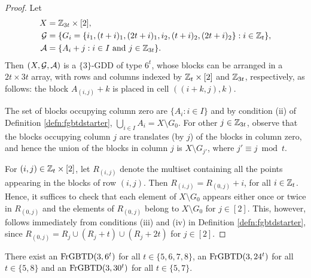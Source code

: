 \documentclass[draft, 11pt]{article}
\begin{document}
\begin{proof}
Let
\begin{align*}
X &= \mathbb Z_{3t}\times[2], \\
\mathcal G &= \{ G_i=\{i_1,(t+i)_1,(2t+i)_1, i_2,(t+i)_2,(2t+i)_2\} : i\in\mathbb Z_t \},  \\
\mathcal A &= \{A_i+j:\text{$i\in I$ and $j\in\mathbb Z_{3t}$}\}.
\end{align*}
Then $(X,\mathcal G,\mathcal A)$ is a $\{3\}$-GDD of type $6^t$, whose blocks can be arranged in a
$2t\times 3t$ array, with rows and columns indexed by $\mathbb Z_t\times[2]$
and $\mathbb Z_{3t}$, respectively, as follows: the block $A_{(i,j)}+k$ is placed in
cell $((i+k,j),k)$.

The set of blocks occupying column zero are $\{A_i:i\in I\}$ and
by condition (ii) of Definition \ref{defn:fgbtdstarter}, $\bigcup_{i\in I} A_i=X\setminus G_0$.
For other $j\in\mathbb Z_{3t}$, observe that the blocks occupying column $j$ are translates
(by $j$) of the blocks in column zero, and hence the union of the blocks
in column $j$ is $X\setminus G_{j'}$, where $j'\equiv j\bmod t$.

For $(i,j)\in\mathbb Z_t\times [2]$, let $R_{(i,j)}$ denote the multiset containing all the points
appearing in the blocks of row $(i,j)$. Then $R_{(i,j)} = R_{(0,j)}+i$,
for all $i\in\mathbb Z_{t}$. Hence, it suffices to check that each element of $X \setminus G_0$
appears either once or twice in $R_{(0,j)}$ and the elements of $R_{(0,j)}$
belong to $X\setminus G_0$ for $j\in [2]$. This, however, follows immediately
from conditions (iii) and (iv) in Definition \ref{defn:fgbtdstarter}, since
$R_{(0,j)}=R_j\cup (R_j+t)\cup (R_j+2t)$ for $j\in [2]$.
\end{proof}


\begin{corollary}
\label{cor:smallfgbtd}
There exist an ${\rm FrGBTD}(3,6^t)$ for all
$t\in\{5,6,7,8\}$, an ${\rm FrGBTD}(3,24^t)$ for all $t\in\{5,8\}$
and an ${\rm FrGBTD}(3,30^t)$ for all $t\in\{5,7\}$.
\end{corollary}
\end{document}
